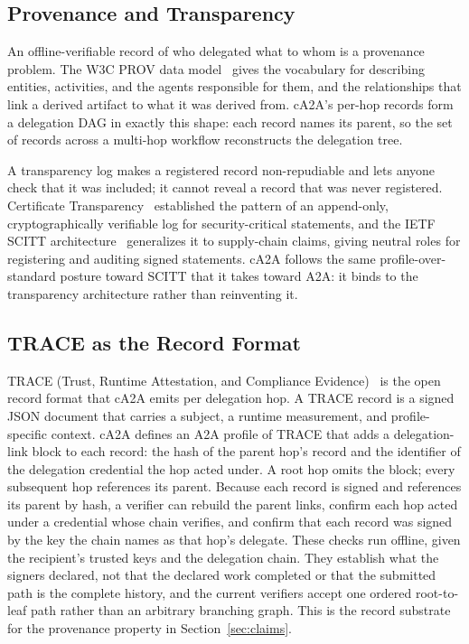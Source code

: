 \subsection{Provenance and Transparency}

An offline-verifiable record of who delegated what to whom is a provenance problem. The
W3C PROV data model~\citep{prov2013} gives the vocabulary for describing entities,
activities, and the agents responsible for them, and the relationships that link a
derived artifact to what it was derived from. cA2A's per-hop records form a delegation DAG
in exactly this shape: each record names its parent, so the set of records across a
multi-hop workflow reconstructs the delegation tree.

A transparency log makes a registered record non-repudiable and lets anyone check that it was
included; it cannot reveal a record that was never registered. Certificate
Transparency~\citep{ct2013} established the pattern of an append-only, cryptographically
verifiable log for security-critical statements, and the IETF SCITT
architecture~\citep{scitt2024} generalizes it to supply-chain claims, giving neutral roles
for registering and auditing signed statements. cA2A follows the same profile-over-standard
posture toward SCITT that it takes toward A2A: it binds to the transparency architecture
rather than reinventing it.

\subsection{TRACE as the Record Format}

TRACE (Trust, Runtime Attestation, and Compliance Evidence)~\citep{trace2025} is the open
record format that cA2A emits per delegation hop. A TRACE record is a signed JSON document
that carries a subject, a runtime measurement, and profile-specific context. cA2A defines
an A2A profile of TRACE that adds a delegation-link block to each record: the hash of the
parent hop's record and the identifier of the delegation credential the hop acted under. A
root hop omits the block; every subsequent hop references its parent. Because each record
is signed and references its parent by hash, a verifier can rebuild the parent links,
confirm each hop acted under a credential whose chain verifies, and confirm that each record
was signed by the key the chain names as that hop's delegate. These checks run offline, given
the recipient's trusted keys and the delegation chain. They establish what the signers
declared, not that the declared work completed or that the submitted path is the complete
history, and the current verifiers accept one ordered root-to-leaf path rather than an
arbitrary branching graph. This is the record substrate for the provenance property in
Section~\ref{sec:claims}.
